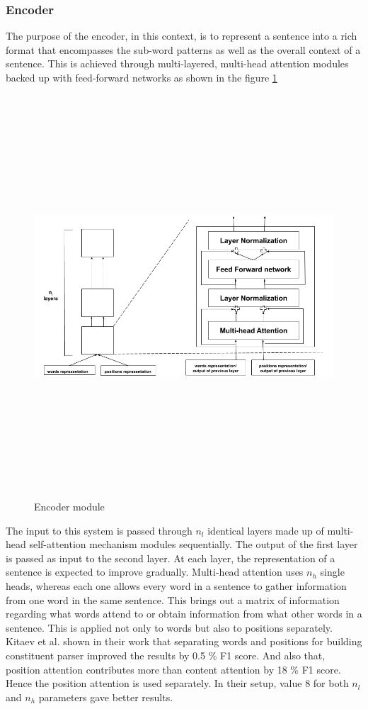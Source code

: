 \documentclass[a4paper, 11pt]{article}
\begin{document}
\subsubsection{Encoder}

The purpose of the encoder, in this context, is to represent a sentence into a rich format that encompasses the sub-word patterns as well as the overall context of a sentence. This is achieved through multi-layered, multi-head attention modules backed up with feed-forward networks as shown in the figure \ref{fig:encoder_module}

\begin{figure}[htpb]
    \centering
    \includegraphics[width=\textwidth,height=15cm,keepaspectratio=true]
    {encoder.png}
    \caption{
        Encoder module
    }
    \label{fig:encoder_module}
\end{figure}

The input to this system is passed through $n_l$ identical layers made up of multi-head self-attention mechanism modules sequentially. The output of the first layer is passed as input to the second layer. At each layer, the representation of a sentence is expected to improve gradually. Multi-head attention uses $n_h$ single heads, whereas each one allows every word in a sentence to gather information from one word in the same sentence. This brings out a matrix of information regarding what words attend to or obtain information from what other words in a sentence. This is applied not only to words but also to positions separately. Kitaev et al. \parencite*{Kitaev2019} shown in their work that separating words and positions for building constituent parser improved the results by 0.5 \% F1 score. And also that, position attention contributes more than content attention by 18 \% F1 score. Hence the position attention is used separately. In their setup, value 8 for both $n_l$ and $n_h$ parameters gave better results. 
\end{document}
